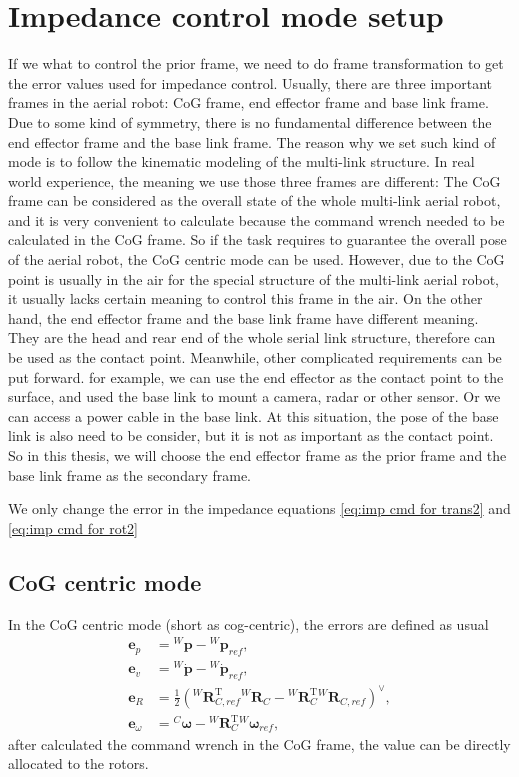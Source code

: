\section{Impedance control mode setup}
If we what to control the prior frame, we need to do frame transformation to get the error values used for impedance control. Usually, there are three important frames in the aerial robot: CoG frame, end effector frame and base link frame. Due to some kind of symmetry, there is no fundamental difference between the end effector frame and the base link frame. The reason why we set such kind of mode is to follow the kinematic modeling of the multi-link structure.
In real world experience, the meaning we use those three frames are different: The CoG frame can be considered as the overall state of the whole multi-link aerial robot, and it is very convenient to calculate because the command wrench needed to be calculated in the CoG frame. So if the task requires to guarantee the overall pose of the aerial robot, the CoG centric mode can be used. However, due to the CoG point is usually in the air for the special structure of the multi-link aerial robot, it usually lacks certain meaning to control this frame in the air. On the other hand, the end effector frame and the base link frame have different meaning. They are the head and rear end of the whole serial link structure, therefore can be used as the contact point. Meanwhile, other complicated requirements can be put forward. for example, we can use the end effector as the contact point to the surface, and used the base link to mount a camera, radar or other sensor. Or we can access a power cable in the base link. At this situation, the pose of the base link is also need to be consider, but it is not as important as the contact point. 
So in this thesis, we will choose the end effector frame as the prior frame and the base link frame as the secondary frame.


We only change the error in the impedance equations \ref{eq:imp cmd for trans2} and \ref{eq:imp cmd for rot2}
\subsection{CoG centric mode}
In the CoG centric mode (short as cog-centric), the errors are defined as usual
\begin{subequations}
\label{eq:error cog mode}
\begin{align}
    {\boldsymbol{e}_p}&={^W\!\boldsymbol{p}}-{^W\!\boldsymbol{p}_{ref}}, \\[2pt]
    {\boldsymbol{e}_v}&={^W\!\dot{\boldsymbol{p}}}-{^W\!\dot{\boldsymbol{p}}_{ref}}, \\[2pt]
    {\boldsymbol{e}_R}&=\frac{1}{2}({^W\!\boldsymbol{R}^{\mathrm{T}}_{C,ref}}{^W\!\boldsymbol{R}_{C}}-{^W\!\boldsymbol{R}^{\mathrm{T}}_{C}}{^W\!\boldsymbol{R}_{C,ref}})^\vee, \\[2pt]
    {\boldsymbol{e}_\omega}&={^C\!\boldsymbol{\omega}}-{^W\!\boldsymbol{R}^{\mathrm{T}}_{C}}{^W\!\boldsymbol{\omega}}_{ref},
\end{align}
\end{subequations}
after calculated the command wrench in the CoG frame, the value can be directly allocated to the rotors.
